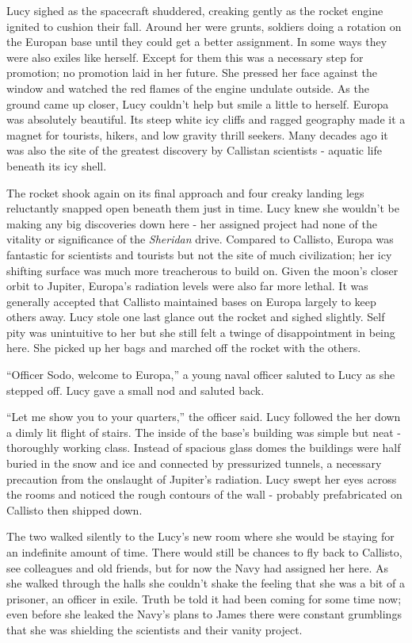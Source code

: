 \documentclass[openany, 12pt]{book} %
\begin{document}
Lucy sighed as the spacecraft shuddered, creaking gently as the rocket engine ignited to cushion their fall. Around her were grunts, soldiers doing a rotation on the Europan base until they could get a better assignment. In some ways they were also exiles like herself. Except for them this was a necessary step for promotion; no promotion laid in her future. She pressed her face against the window and watched the red flames of the engine undulate outside. As the ground came up closer, Lucy couldn't help but smile a little to herself. Europa was absolutely beautiful. Its steep white icy cliffs and ragged geography made it a magnet for tourists, hikers, and low gravity thrill seekers. Many decades ago it was also the site of the greatest discovery by Callistan scientists - aquatic life beneath its icy shell.

The rocket shook again on its final approach and four creaky landing legs reluctantly snapped open beneath them just in time. Lucy knew she wouldn't be making any big discoveries down here - her assigned project had none of the vitality or significance of the \textit{Sheridan}  drive. Compared to Callisto, Europa was fantastic for scientists and tourists but not the site of much civilization; her icy shifting surface was much more treacherous to build on. Given the moon's closer orbit to Jupiter, Europa's radiation levels were also far more lethal. It was generally accepted that Callisto maintained bases on Europa largely to keep others away. Lucy stole one last glance out the rocket and sighed slightly. Self pity was unintuitive to her but she still felt a twinge of disappointment in being here. She picked up her bags and marched off the rocket with the others.

``Officer Sodo, welcome to Europa,'' a young naval officer saluted to Lucy as she stepped off. Lucy gave a small nod and saluted back.

 ``Let me show you to your quarters,'' the officer said. Lucy followed the her down a dimly lit flight of stairs. The inside of the base's building was simple but neat - thoroughly working class. Instead of spacious glass domes the buildings were half buried in the snow and ice and connected by pressurized tunnels, a necessary precaution from the onslaught of Jupiter's radiation. Lucy swept her eyes across the rooms and noticed the rough contours of the wall - probably prefabricated on Callisto then shipped down.

The two walked silently to the Lucy's new room where she would be staying for an indefinite amount of time. There would still be chances to fly back to Callisto, see colleagues and old friends, but for now the Navy had assigned her here. As she walked through the halls she couldn't shake the feeling that she was a bit of a prisoner, an officer in exile. Truth be told it had been coming for some time now; even before she leaked the Navy's plans to James there were constant grumblings that she was shielding the scientists and their vanity project.
\end{document}
